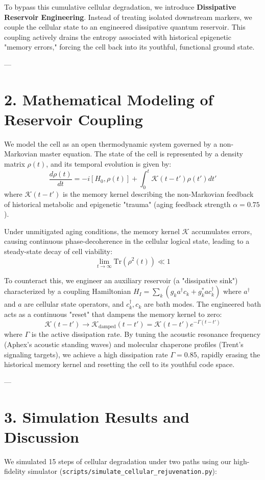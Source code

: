 \documentclass[11pt,twocolumn]{article}
\begin{document}
To bypass this cumulative cellular degradation, we introduce \textbf{Dissipative Reservoir Engineering}. Instead of treating isolated downstream markers, we couple the cellular state to an engineered dissipative quantum reservoir. This coupling actively drains the entropy associated with historical epigenetic "memory errors," forcing the cell back into its youthful, functional ground state.

---

\section{2. Mathematical Modeling of Reservoir Coupling}
We model the cell as an open thermodynamic system governed by a non-Markovian master equation. The state of the cell is represented by a density matrix $\rho(t)$, and its temporal evolution is given by:
$$\frac{d\rho(t)}{dt} = -i [H_0, \rho(t)] + \int_0^t \mathcal{K}(t - t') \rho(t') dt'$$
where $\mathcal{K}(t - t')$ is the memory kernel describing the non-Markovian feedback of historical metabolic and epigenetic "trauma" (aging feedback strength $\alpha = 0.75$).

Under unmitigated aging conditions, the memory kernel $\mathcal{K}$ accumulates errors, causing continuous phase-decoherence in the cellular logical state, leading to a steady-state decay of cell viability:
$$\lim_{t \to \infty} \text{Tr}(\rho^2(t)) \ll 1$$

To counteract this, we engineer an auxiliary reservoir (a "dissipative sink") characterized by a coupling Hamiltonian $H_I = \sum_k (g_k a^\dagger c_k + g_k^* a c_k^\dagger)$ where $a^\dagger$ and $a$ are cellular state operators, and $c_k^\dagger, c_k$ are bath modes. The engineered bath acts as a continuous "reset" that dampens the memory kernel to zero:
$$\mathcal{K}(t - t') \to \mathcal{K}_{\text{damped}}(t - t') = \mathcal{K}(t - t') e^{-\Gamma (t - t')}$$
where $\Gamma$ is the active dissipation rate. By tuning the acoustic resonance frequency (Aphex's acoustic standing waves) and molecular chaperone profiles (Trent's signaling targets), we achieve a high dissipation rate $\Gamma = 0.85$, rapidly erasing the historical memory kernel and resetting the cell to its youthful code space.

---

\section{3. Simulation Results and Discussion}
We simulated 15 steps of cellular degradation under two paths using our high-fidelity simulator (\texttt{scripts/simulate_cellular_rejuvenation.py}):
\end{document}

